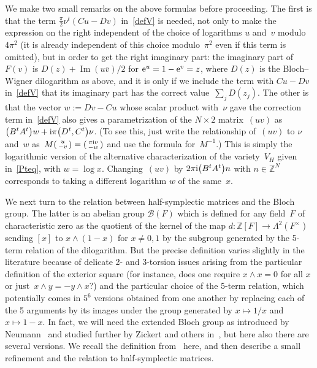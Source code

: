 \documentclass[pdftex]{sigma}
\numberwithin{equation}{section}
\def\Z{\mathbb Z}
\def\i{^{-1}}
\def\B{\mathcal B} \def\hB{\widehat\B}
\def\WW{\Lambda^2}
\begin{document}
We make two small remarks on the above formulas before proceeding. The first is that
the term $\frac\pi2 \nu^t(Cu-Dv)$ in~\eqref{defV} is needed, not only to make the
expression on the right independent of the choice of logarithms $u$ and~$v$
modulo~$4\pi^2$ (it is already independent of this choice modulo~$\pi^2$ even if
this term is omitted), but in order to get the right imaginary part: the imaginary
part of $F(v)$ is $D(z)+\operatorname{Im}(u\bar v)/2$ for ${\rm e}^u=1-{\rm e}^v=z$, where $D(z)$ is the
Bloch--Wigner dilogarithm as above, and it is only if we include the term with $Cu-Dv$
in~\eqref{defV} that its imaginary part has the correct value~$\sum_jD(z_j)$. The
other is that the vector $w:=Dv-Cu$ whose scalar product with~$\nu$ gave the
correction term in~\eqref{defV} also gives a parametrization of the $N\times2$
matrix~$(u v)$ as $\big(B^t A^t\big)w+{\rm i}\pi\big(D^t,C^t\big)\nu$.
\big(To see this, just write the relationship of~$(u v)$ to $\nu$ and~$w$ as~$M (\smallmatrix u\\-v\endsmallmatrix)=(\smallmatrix \pi {\rm i}\nu\\-w\endsmallmatrix)$
and use the formula for~$M\i$.\big) This is simply the logarithmic version of the
alternative characterization of the variety~$V_H$ given in~\eqref{Pteq}, with
$w=\log x$. Changing~$(u v)$ by $2\pi {\rm i}\big(B^t A^t\big)n$ with $n\in\Z^N$
corresponds to taking a different logarithm $w$ of the same~$x$.

We next turn to the relation between half-symplectic matrices and the Bloch group.
The latter is an abelian group $\B(F)$ which is defined for any field~$F$ of
characteristic zero as the quotient of the kernel of the map $d\colon\Z[F]\to\WW(F^\times)$
sending $[x]$ to $x\wedge(1-x)$ for $x\ne0,1$ by the subgroup generated by the 5-term
relation of the dilogarithm. But the precise definition varies slightly in the
literature because of delicate 2- and 3-torsion issues arising from the particular
definition of the exterior square (for instance, does one require $x\wedge x=0$ for
all $x$ or just~${x\wedge y=-y\wedge x }$?) and the particular choice of the 5-term
relation, which potentially comes in $5^6$ versions obtained from one another by
replacing each of the 5 arguments by its images under the group generated by
$x\mapsto1/x$ and $x\mapsto1-x$. In fact, we will need the extended Bloch group as
introduced by Neumann~\cite{Neumann:CS} and studied further by Zickert and others
in~\cite{Goette,Zickert:extended}, but here also there are several versions.
We recall the definition from~\cite{Zickert:extended} here, and then
describe a small refinement and the relation to half-symplectic matrices.
\end{document}
